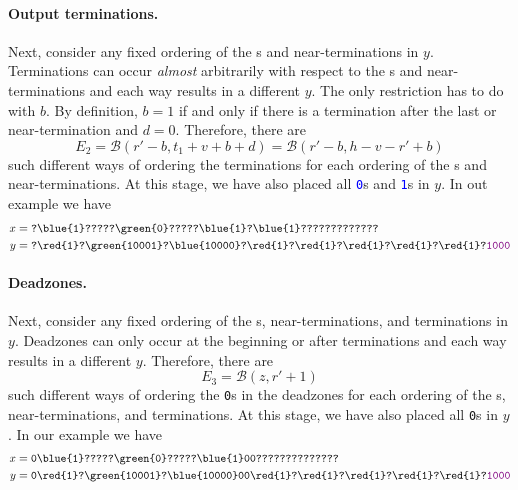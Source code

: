 \paragraph{Output terminations.}
Next, consider any fixed ordering of the \texttt{}s and near-terminations in $y$. Terminations can occur \emph{almost} arbitrarily with respect to the \texttt{}s and near-terminations and each way results in a different $y$. The only restriction has to do with $b$. By definition, $b=1$ if and only if there is a termination after the last \texttt{} or near-termination and $d = 0$. Therefore, there are
$$
E_2=\mathcal{B}(r'-b,t_1+v+b+d)=\mathcal{B}(r'-b,h-v-r'+b)
$$
such different ways of ordering the terminations for each ordering of the \texttt{}s and near-terminations.
At this stage, we have also placed all \texttt{\textcolor{blue}{0}}s and \texttt{\textcolor{blue}{1}}s in $y$. In out example we have
\begin{align*}
  x&=\texttt{?\blue{1}?????\green{0}?????\blue{1}?\blue{1}?????????????}\\
  y&=\texttt{?\red{1}?\green{10001}?\blue{10000}?\red{1}?\red{1}?\red{1}?\red{1}?\red{1}?\textcolor{violet}{1000}}
\end{align*}

\paragraph{Deadzones.}
Next, consider any fixed ordering of the \texttt{}s, near-terminations, and terminations in $y$. Deadzones can only occur at the beginning or after terminations and each way results in a different $y$. Therefore, there are
$$
E_3=\mathcal{B}(z,r'+1)
$$
such different ways of ordering the \texttt{0}s in the deadzones for each ordering of the \texttt{}s, near-terminations, and terminations. At this stage, we have also placed all \texttt{0}s in $y$. In our example we have
\begin{align*}
  x&=\texttt{0\blue{1}?????\green{0}?????\blue{1}00??????????????}\\
  y&=\texttt{0\red{1}?\green{10001}?\blue{10000}00\red{1}?\red{1}?\red{1}?\red{1}?\red{1}?\textcolor{violet}{1000}}
\end{align*}

